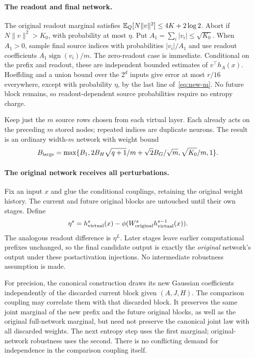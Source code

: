 \paragraph{The readout and final network.}
The original readout marginal satisfies
$\mathbb E_Q[N\|v\|^2]\le4K+2\log2$. Abort if $N\|v\|^2>K_0$, with probability
at most $\eta$. Put $A_1=\sum_i|v_i|\le\sqrt{K_0}$. When $A_1>0$,
sample final source indices with probabilities $|v_i|/A_1$ and use readout
coefficients $A_1\operatorname{sign}(v_i)/m$. The zero-readout case is
immediate. Conditional on the prefix and readout, these are independent
bounded estimates of $v^\top h_A(x)$. Hoeffding and a union bound over the
$2^d$ inputs give error at most $r/16$ everywhere, except with probability
$\eta$, by the last line of~\eqref{eq:new-m}. No future block remains, so
readout-dependent source probabilities require no entropy charge.

Keep just the $m$ source rows chosen from each virtual layer. Each already
acts on the preceding $m$ stored nodes; repeated indices are duplicate
neurons. The result is an ordinary width-$m$ network with weight bound
\[
 B_{\rm large}=\max\{B_1,
 2B_H\sqrt{q+1}/m+\sqrt2B_G/\sqrt m,\sqrt{K_0}/m,1\}.
\]
\paragraph{The original network receives all perturbations.}
Fix an input $x$ and glue the conditional couplings, retaining the original
weight history. The current and future original blocks are untouched until
their own stages. Define
\[
 \eta^s=h^s_{\rm virtual}(x)
           -\phi(W^s_{\rm original}h^{s-1}_{\rm virtual}(x)).
\]
The analogous readout difference is $\eta^L$. Later stages leave earlier
computational prefixes unchanged, so the final candidate output is exactly
the \emph{original} network's output under these postactivation injections.
No intermediate robustness assumption is made.

For precision, the canonical construction draws its new Gaussian coefficients
independently of the discarded current block given $(A,J,H)$. The comparison
coupling may correlate them with that discarded block. It preserves the same
joint marginal of the new prefix and the future original blocks, as well as
the original full-network marginal, but need not preserve the canonical joint
law with all discarded weights. The next entropy step uses the first marginal;
original-network robustness uses the second. There is no conflicting demand
for independence in the comparison coupling itself.

